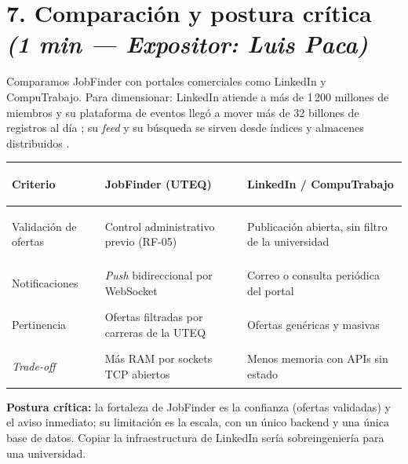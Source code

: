 \documentclass[11pt,a4paper]{article}
\newcommand{\expo}[2]{\hfill{\small\textit{(#1 — Expositor: #2)}}}
\begin{document}
\section*{7. Comparación y postura crítica \expo{1 min}{Luis Paca}}
Comparamos JobFinder con portales comerciales como LinkedIn y CompuTrabajo. Para
dimensionar: LinkedIn atiende a más de 1\,200 millones de miembros y su
plataforma de eventos llegó a mover más de 32 billones de registros al día
\cite{linkedin2025northguard}; su \textit{feed} y su búsqueda se sirven desde
índices y almacenes distribuidos \cite{linkedinFeedInfra}.
\begin{center}
\small
\begin{tabularx}{\linewidth}{>{\bfseries\raggedright\arraybackslash}p{3.1cm}
                             >{\raggedright\arraybackslash}X
                             >{\raggedright\arraybackslash}X}
\toprule
Criterio & JobFinder (UTEQ) & LinkedIn / CompuTrabajo\\
\midrule
Validación de ofertas & Control administrativo previo (RF-05) & Publicación abierta, sin filtro de la universidad\\
Notificaciones & \textit{Push} bidireccional por WebSocket & Correo o consulta periódica del portal\\
Pertinencia & Ofertas filtradas por carreras de la UTEQ & Ofertas genéricas y masivas\\
\textit{Trade-off} & Más RAM por sockets TCP abiertos & Menos memoria con APIs sin estado\\
\bottomrule
\end{tabularx}
\end{center}
\textbf{Postura crítica:} la fortaleza de JobFinder es la confianza (ofertas
validadas) y el aviso inmediato; su limitación es la escala, con un único backend
y una única base de datos. Copiar la infraestructura de LinkedIn sería
sobreingeniería para una universidad.

\end{document}
